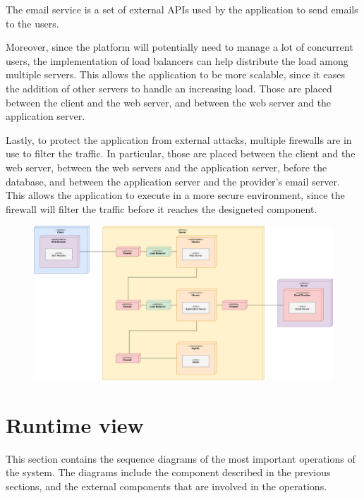 The email service is a set of external APIs used by the application to send emails to the users.

Moreover, since the platform will potentially need to manage a lot of concurrent users, the implementation of load balancers can help distribute the load among multiple servers.
This allows the application to be more scalable, since it eases the addition of other servers to handle an increasing load.
Those are placed between the client and the web server, and between the web server and the application server.

Lastly, to protect the application from external attacks, multiple firewalls are in use to filter the traffic.
In particular, those are placed between the client and the web server, between the web servers and the application server, before the database, and between the application server and the provider's email server.
This allows the application to execute in a more secure environment, since the firewall will filter the traffic before it reaches the designeted component.

\begin{figure}[H]
    \centering
    \includegraphics[width=0.8\linewidth]{../../assets/deployment-diagrams/deployment-diagram.png}
\end{figure}

\section{Runtime view}

This section contains the sequence diagrams of the most important operations of the system.
The diagrams include the component described in the previous sections, and the external components that are involved in the operations.

